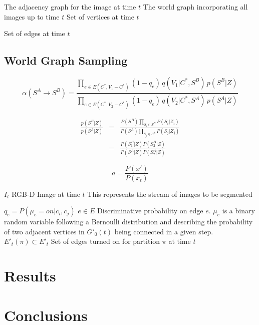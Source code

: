 \documentclass[10pt,letterpaper]{article}
\begin{document}
	 The adjacency graph for the image at time $t$
 The world graph incorporating all images up to time $t$
 Set of vertices at time $t$



Set of edges at time $t$ 
\subsection{World Graph Sampling}

\begin{equation}
\alpha(S^{A}\rightarrow S^{B})=\frac{\prod_{e\in E(C^{*},V_{1}-C^{*})}(1-q_{e})\, q(V_{1}|C^{*},S^{B})\, p(S^{B}|Z)}{\prod_{e\in E(C^{*},V_{2}-C^{*})}(1-q_{e})\, q(V_{2}|C^{*},S^{A})\, p(S^{A}|Z)}\label{eq: acceptanceRatio}
\end{equation}

\begin{eqnarray}
\frac{p(S^{B}|Z)}{p(S^{A}|Z)} & = & \frac{P(S^{B})\prod_{S_{i}\in S^{B}}P(S_{i}|Z_{i})}{P(S^{A})\prod_{S_{j}\in S^{A}}P(S_{j}|Z_{j})}\nonumber \\
 & = & \frac{P(S_{1}^{B}|Z)P(S_{2}^{B}|Z)}{P(S_{1}^{A}|Z)P(S_{2}^{A}|Z)}\label{eq:jumpProb}
\end{eqnarray}

\[a=\frac{P(x')}{P(x_t)}\]

	$I_t$ RGB-D Image at time $t$ This represents the stream of images to be segmented

$q_e=P(\mu_e=on|c_i,c_j)$ $e\in{E}$ Discriminative probability on edge $e$. $\mu_e$ is a binary random variable following a Bernoulli distribution and describing the probability of two adjacent vertices in $G'_0(t)$ being connected in a given step.
$E'_t(\pi)\subset{E'_t}$ Set of edges turned on for partition $\pi$ at time $t$
\section{Results}

\cite{sturm12iros}

\section{Conclusions}



\end{document}
